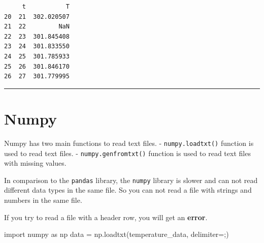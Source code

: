 \documentclass[
  letterpaper,
  DIV=11,
  numbers=noendperiod]{scrreprt}
\newenvironment{Shaded}{\begin{snugshade}}{\end{snugshade}}
\newcommand{\ImportTok}[1]{\textcolor[rgb]{0.00,0.46,0.62}{#1}}
\newcommand{\NormalTok}[1]{\textcolor[rgb]{0.00,0.23,0.31}{#1}}
\newcommand{\OperatorTok}[1]{\textcolor[rgb]{0.37,0.37,0.37}{#1}}
\newcommand{\StringTok}[1]{\textcolor[rgb]{0.13,0.47,0.30}{#1}}
\begin{document}
\begin{verbatim}
     t           T
20  21  302.020507
21  22         NaN
22  23  301.845408
23  24  301.833550
24  25  301.785933
25  26  301.846170
26  27  301.779995
\end{verbatim}

\begin{center}\rule{0.5\linewidth}{0.5pt}\end{center}

\section*{Numpy}\label{numpy-1}


Numpy has two main functions to read text files. -
\texttt{numpy.loadtxt()} function is used to read text files. -
\texttt{numpy.genfromtxt()} function is used to read text files with
missing values.

In comparison to the \texttt{pandas} library, the \texttt{numpy} library
is slower and can not read different data types in the same file. So you
can not read a file with strings and numbers in the same file.

If you try to read a file with a header row, you will get an
\textbf{error}.

\begin{Shaded}
\begin{Highlighting}[]
\ImportTok{import}\NormalTok{ numpy }\ImportTok{as}\NormalTok{ np}
\NormalTok{data }\OperatorTok{=}\NormalTok{ np.loadtxt(temperature\_data, delimiter}\OperatorTok{=}\StringTok{\textquotesingle{};\textquotesingle{}}\NormalTok{)}
\end{Highlighting}
\end{Shaded}
\end{document}
